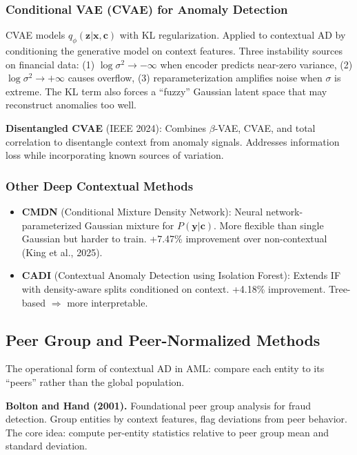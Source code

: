 \documentclass[11pt]{article}
\begin{document}
\subsubsection{Conditional VAE (CVAE) for Anomaly Detection}

CVAE models $q_\phi(\mathbf{z}|\mathbf{x}, \mathbf{c})$ with KL regularization. Applied to contextual AD by conditioning the generative model on context features. Three instability sources on financial data: (1) $\log\sigma^2 \to -\infty$ when encoder predicts near-zero variance, (2) $\log\sigma^2 \to +\infty$ causes overflow, (3) reparameterization amplifies noise when $\sigma$ is extreme. The KL term also forces a ``fuzzy'' Gaussian latent space that may reconstruct anomalies too well.

\textbf{Disentangled CVAE} (IEEE 2024): Combines $\beta$-VAE, CVAE, and total correlation to disentangle context from anomaly signals. Addresses information loss while incorporating known sources of variation.

\subsubsection{Other Deep Contextual Methods}

\begin{itemize}
\item \textbf{CMDN} (Conditional Mixture Density Network): Neural network-parameterized Gaussian mixture for $P(\mathbf{y}|\mathbf{c})$. More flexible than single Gaussian but harder to train. +7.47\% improvement over non-contextual (King et al., 2025).
\item \textbf{CADI} (Contextual Anomaly Detection using Isolation Forest): Extends IF with density-aware splits conditioned on context. +4.18\% improvement. Tree-based $\Rightarrow$ more interpretable.
\end{itemize}

\subsection{Peer Group and Peer-Normalized Methods}

The operational form of contextual AD in AML: compare each entity to its ``peers'' rather than the global population.

\textbf{Bolton and Hand (2001).} Foundational peer group analysis for fraud detection. Group entities by context features, flag deviations from peer behavior. The core idea: compute per-entity statistics relative to peer group mean and standard deviation.
\end{document}
